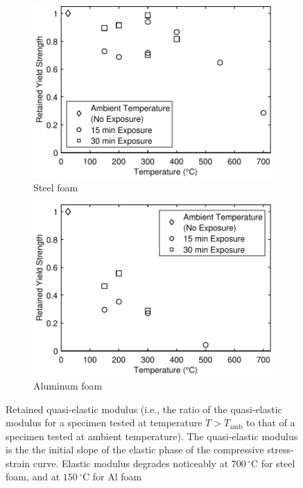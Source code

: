 \documentclass[review]{elsarticle}
\begin{document}
{\begin{figure}
	\centering
	\begin{subfigure}{.5\textwidth}
		\centering
		\includegraphics[width=0.95\linewidth]
		{Tex-Figures/Fig13a-yield_stress.pdf}
		\caption{Steel foam}
		\label{fig3:sub1}
	\end{subfigure}%
	\begin{subfigure}{.5\textwidth}
		\centering
		\includegraphics[width=0.95\linewidth]
		{Tex-Figures/Fig13b-yield_stress.pdf}
		\caption{Aluminum foam}
		\label{fig3:sub2}
	\end{subfigure}
	\caption{Retained quasi-elastic modulus (i.e., the ratio of the quasi-elastic modulus for a specimen tested at temperature $T>T_\text{amb}$ to that of a specimen tested at ambient temperature). The quasi-elastic modulus is the the initial slope of the elastic phase of the compressive stress-strain curve. Elastic modulus degrades noticeably at $700\,^{\circ}\mathrm{C}$ for steel foam, and at $150\,^{\circ}\mathrm{C}$ for Al foam}
	\label{Quasi-elastic_modulus}
\end{figure}


}
\end{document}
